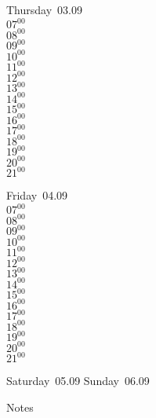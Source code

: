 \documentclass[11pt,a4paper]{book}\usepackage[]{graphicx}\usepackage[]{color}
\begin{document}
\clearpage
\begin{headerbox}
\end{headerbox}
\begin{weekdaybox}
  Thursday~03.09\\
  { 
  \vfill
  $07^{00}$\\
$08^{00}$\\
$09^{00}$\\
$10^{00}$\\
$11^{00}$\\
$12^{00}$\\
$13^{00}$\\
$14^{00}$\\
$15^{00}$\\
$16^{00}$\\
$17^{00}$\\
$18^{00}$\\
$19^{00}$\\
$20^{00}$\\
$21^{00}$\\
  }
\end{weekdaybox} 
\begin{weekdaybox}
  Friday~04.09\\
  { 
  \vfill
  $07^{00}$\\
$08^{00}$\\
$09^{00}$\\
$10^{00}$\\
$11^{00}$\\
$12^{00}$\\
$13^{00}$\\
$14^{00}$\\
$15^{00}$\\
$16^{00}$\\
$17^{00}$\\
$18^{00}$\\
$19^{00}$\\
$20^{00}$\\
$21^{00}$\\
  }
\end{weekdaybox}
\begin{weekendbox}
  Saturday~05.09
  \tcblower
  Sunday~06.09
\end{weekendbox} %
\begin{notebox}
  Notes
\end{notebox}
\clearpage
\end{document}
